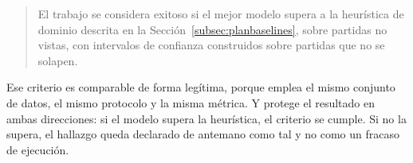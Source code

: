 \begin{quote}
El trabajo se considera exitoso si el mejor modelo supera a la heurística de
dominio descrita en la Sección~\ref{subsec:planbaselines}, sobre partidas no
vistas, con intervalos de confianza construidos sobre partidas que no se
solapen.
\end{quote}

Ese criterio es comparable de forma legítima, porque emplea el mismo
conjunto de datos, el mismo protocolo y la misma métrica. Y protege el
resultado en ambas direcciones: si el modelo supera la heurística, el
criterio se cumple. Si no la supera, el hallazgo queda declarado de antemano
como tal y no como un fracaso de ejecución.